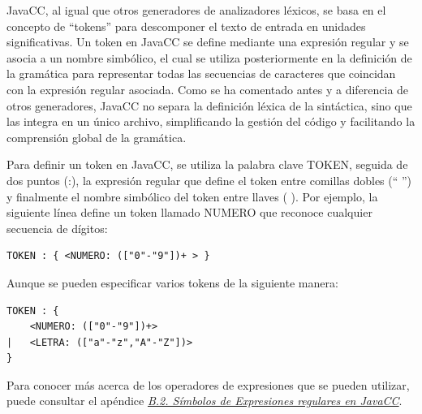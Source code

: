 

JavaCC, al igual que otros generadores de analizadores léxicos, se basa en el concepto de ``tokens'' para descomponer el texto de entrada en unidades significativas. Un token en JavaCC se define mediante una expresión regular y se asocia a un nombre simbólico, el cual se utiliza posteriormente en la definición de la gramática para representar todas las secuencias de caracteres que coincidan con la expresión regular asociada. Como se ha comentado antes y a diferencia de otros generadores, JavaCC no separa la definición léxica de la sintáctica, sino que las integra en un único archivo, simplificando la gestión del código y facilitando la comprensión global de la gramática.

Para definir un token en JavaCC, se utiliza la palabra clave TOKEN, seguida de dos puntos (:), la expresión regular que define el token entre comillas dobles (`` '') y finalmente el nombre simbólico del token entre llaves ({ }). Por ejemplo, la siguiente línea define un token llamado NUMERO que reconoce cualquier secuencia de dígitos:

\lstset{inputencoding=utf8/latin1}
\begin{lstlisting}
TOKEN : { <NUMERO: (["0"-"9"])+ > } 
\end{lstlisting}

Aunque se pueden especificar varios tokens de la siguiente manera:

\lstset{inputencoding=utf8/latin1}
\begin{lstlisting}
TOKEN : {
	<NUMERO: (["0"-"9"])+>
|	<LETRA: (["a"-"z","A"-"Z"])>
}
\end{lstlisting}

Para conocer más acerca de los operadores de expresiones que se pueden utilizar, puede consultar el apéndice \hyperref[sec:simbolosdeexpresionesregulares]{\textit{B.2. Símbolos de Expresiones regulares en JavaCC}}.

